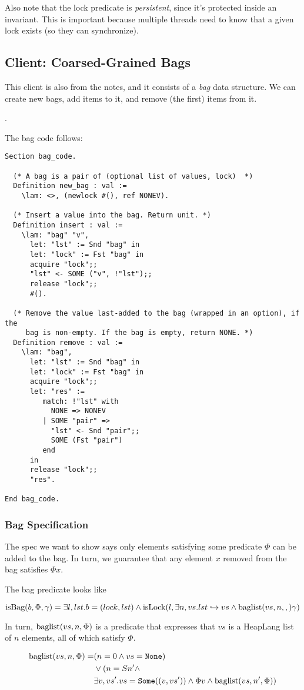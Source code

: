 Also note that the lock predicate is \emph{persistent}, since it's protected inside an invariant. This is important because multiple threads need to know that a given lock exists (so they can synchronize).

\subsection{Client: Coarsed-Grained Bags}

This client is also from the notes, and it consists of a \emph{bag} data structure. We can create new bags, add items to it, and remove (the first) items from it.

.

The bag code follows:

\begin{verbatim}
Section bag_code.

  (* A bag is a pair of (optional list of values, lock)  *)
  Definition new_bag : val :=
    \lam: <>, (newlock #(), ref NONEV).

  (* Insert a value into the bag. Return unit. *)
  Definition insert : val :=
    \lam: "bag" "v",
      let: "lst" := Snd "bag" in
      let: "lock" := Fst "bag" in
      acquire "lock";;
      "lst" <- SOME ("v", !"lst");;
      release "lock";;        
      #().        

  (* Remove the value last-added to the bag (wrapped in an option), if the
     bag is non-empty. If the bag is empty, return NONE. *)
  Definition remove : val :=
    \lam: "bag",
      let: "lst" := Snd "bag" in
      let: "lock" := Fst "bag" in
      acquire "lock";;
      let: "res" :=
         match: !"lst" with
           NONE => NONEV
         | SOME "pair" =>
           "lst" <- Snd "pair";;
           SOME (Fst "pair")
         end
      in           
      release "lock";;
      "res".        
  
End bag_code.
\end{verbatim}

\subsubsection{Bag Specification}

The spec we want to show says only elements satisfying some predicate $\Phi$ can be added to the bag. In turn, we guarantee that any element $x$ removed from the bag satisfies $\Phi x$.

The bag predicate looks like

\[ \text{isBag}{(b, \Phi, \gamma)}  = \exists l, lst. b = (lock, lst) \land \text{isLock}{(l, \exists n, vs. lst \hookrightarrow vs \land \text{baglist}(vs, n, ,) \gamma)}  \]

In turn, $\text{baglist}(vs, n, \Phi)$ is a predicate that expresses that $vs$ is a HeapLang list of $n$ elements, all of which satisfy $\Phi$.

\begin{align*}
\text{baglist}(vs, n, \Phi) =& (n = 0 \land vs = \texttt{None}) \\
& \lor (n = S n' \land \\
& \exists v, vs'. vs = \texttt{Some}((v, vs')) \land \Phi v \land \text{baglist}(vs, n', \Phi) ) 
\end{align*}
